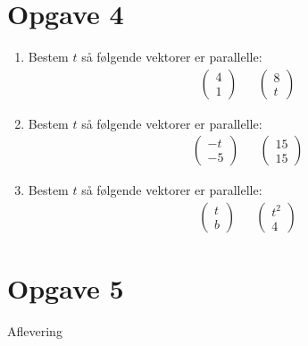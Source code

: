 \section*{Opgave 4}
\begin{enumerate}[label=\roman*)]
 \item Bestem $t$ så følgende vektorer er parallelle:
\begin{align*}
	&\begin{pmatrix}
		4 \\ 1
	\end{pmatrix} 
	&&\begin{pmatrix}
		8 \\ t
	\end{pmatrix}
\end{align*}
\item Bestem $t$ så følgende vektorer er parallelle:
\begin{align*}
	&\begin{pmatrix}
		-t \\ -5
	\end{pmatrix} 
	&&\begin{pmatrix}
		15 \\ 15
	\end{pmatrix}
\end{align*}
\item 
Bestem $t$ så følgende vektorer er parallelle:
\begin{align*}
	&\begin{pmatrix}
		t \\ b
	\end{pmatrix} 
	&&\begin{pmatrix}
		t^2 \\ 4 
	\end{pmatrix}
\end{align*}
\end{enumerate}
\section*{Opgave 5}

Aflevering
